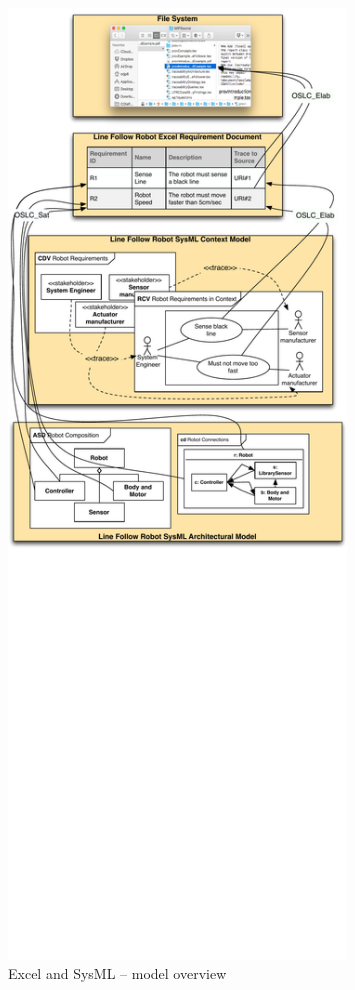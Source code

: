 \begin{description}
\begin{figure}
	\centering
	\includegraphics[width=0.8\textwidth]{figures/RE_4}
\caption{Excel and SysML -- model overview}
\label{fig:re-excel-sysml}
\end{figure}


\end{description}
